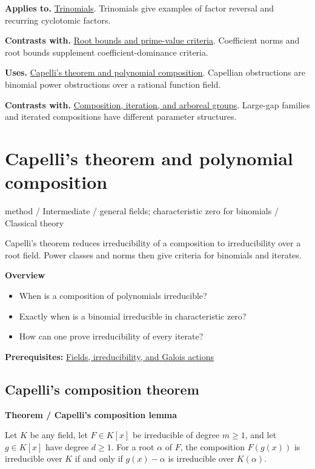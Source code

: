 \documentclass[11pt,a4paper,oneside,openany]{book}
\begin{document}
\color{black}\textbf{Applies to.} \hyperlink{article:trinomials}{Trinomials}. Trinomials give examples of factor reversal and recurring cyclotomic factors.\par
\color{black}\textbf{Contrasts with.} \hyperlink{article:archimedean-criteria}{Root bounds and prime-value criteria}. Coefficient norms and root bounds supplement coefficient-dominance criteria.\par
\color{black}\textbf{Uses.} \hyperlink{article:capelli-composition}{Capelli's theorem and polynomial composition}. Capellian obstructions are binomial power obstructions over a rational function field.\par
\color{black}\textbf{Contrasts with.} \hyperlink{article:composition-iteration}{Composition, iteration, and arboreal groups}. Large-gap families and iterated compositions have different parameter structures.\par
\endgroup
\chapter{Capelli's theorem and polynomial composition}\label{article:capelli-composition}\hypertarget{article:capelli-composition}{}\color{black}
{\sffamily\small\color{atlasgold}method / Intermediate / general fields; characteristic zero for binomials / Classical theory}\par\medskip
Capelli's theorem reduces irreducibility of a composition to irreducibility over a root field. Power classes and norms then give criteria for binomials and iterates.\par\medskip
\textbf{Overview}\begin{itemize}
\item When is a composition of polynomials irreducible?
\item Exactly when is a binomial irreducible in characteristic zero?
\item How can one prove irreducibility of every iterate?
\end{itemize}
{\small\textbf{Prerequisites:} \hyperlink{article:foundations}{Fields, irreducibility, and Galois actions}}\par
{}\section{Capelli's composition theorem}

\begin{atlasblock}[standard]
\textbf{\sffamily Theorem  /  Capelli's composition lemma}\par\smallskip
\color{black} Let \(K\) be any field, let \(F\in K[x]\) be irreducible of degree \(m\ge1\), and let \(g\in K[x]\) have degree \(d\ge1\). For a root \(\alpha\) of \(F\), the composition \(F(g(x))\) is irreducible over \(K\) if and only if \(g(x)-\alpha\) is irreducible over \(K(\alpha)\).\par
\end{atlasblock}\color{black}
\end{document}
